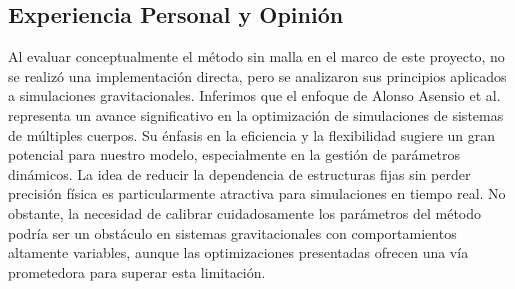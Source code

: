 \subsection{Experiencia Personal y Opinión}

Al evaluar conceptualmente el método sin malla en el marco de este proyecto, no se realizó una implementación directa, pero se analizaron sus principios aplicados a simulaciones gravitacionales. Inferimos que el enfoque de Alonso Asensio et al. representa un avance significativo en la optimización de simulaciones de sistemas de múltiples cuerpos. Su énfasis en la eficiencia y la flexibilidad sugiere un gran potencial para nuestro modelo, especialmente en la gestión de parámetros dinámicos. La idea de reducir la dependencia de estructuras fijas sin perder precisión física es particularmente atractiva para simulaciones en tiempo real. No obstante, la necesidad de calibrar cuidadosamente los parámetros del método podría ser un obstáculo en sistemas gravitacionales con comportamientos altamente variables, aunque las optimizaciones presentadas ofrecen una vía prometedora para superar esta limitación.